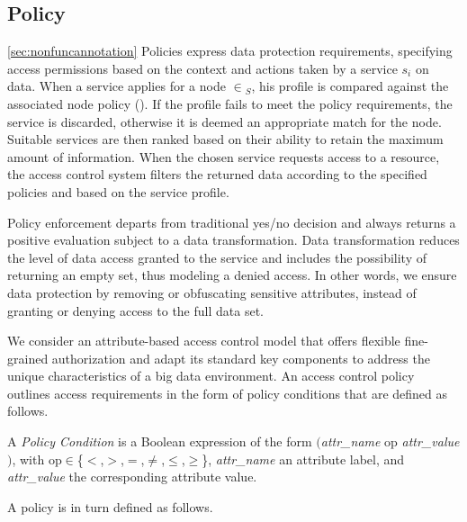 \subsection{Policy}\ref{sec:nonfuncannotation}
Policies express data protection requirements, specifying access permissions based on the context and actions taken by a service $s_i$ on data.
When a service applies for a node $\in$\V$_S$, his profile is compared against the associated node policy \myLambda().
If the profile fails to meet the policy requirements, the service is discarded, otherwise it is deemed an appropriate match for the node.
Suitable services are then ranked based on their ability to retain the maximum amount of information.
When the chosen service requests access to a resource, the access control system filters the returned data according to the specified policies and based on the service profile.

Policy enforcement departs from traditional yes/no decision and always returns a positive evaluation subject to a data transformation.
Data transformation reduces the level of data access granted to the service and includes the possibility of returning an empty set, thus modeling a denied access.
In other words, we ensure data protection by removing or obfuscating sensitive attributes, instead of granting or denying access to the full data set.

We consider an attribute-based access control model that offers flexible fine-grained authorization and adapt its standard key components to address the unique characteristics of a big data environment.
An access control policy outlines access requirements in the form of policy conditions that are defined as follows.

\begin{definition}\label{def:policy_cond}
  A \emph{Policy Condition} is a Boolean expression of the form $($\emph{attr\_name} op \emph{attr\_value}$)$, with op$\in$\{$<$,$>$,$=$,$\neq$,$\leq$,$\geq$\}, \emph{attr\_name} an attribute label, and \emph{attr\_value} the corresponding attribute value.
\end{definition}

A policy is in turn defined as follows.

